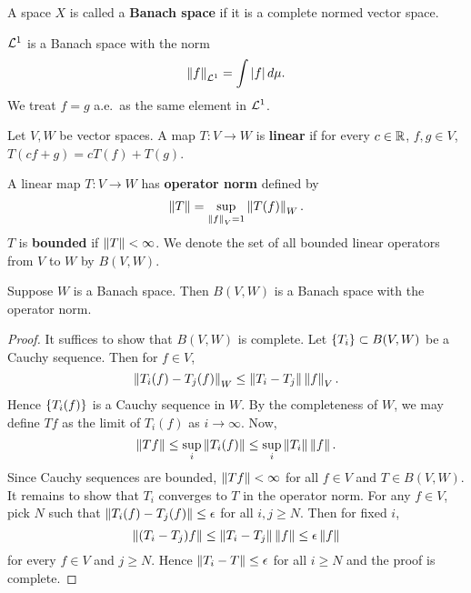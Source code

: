 \begin{definition}
    A space $X$ is called a \textbf{Banach space} if it is a 
    complete normed vector space.
\end{definition}
\begin{remark}
    $\mathcal{L}^1$ is a Banach space with the norm 
    \begin{equation*}
        \left\lVert {f} \right\rVert_{\mathcal{L}^1} = \int \left\lvert {f} \right\rvert d\mu.
    \end{equation*}
    We treat $f = g$ a.e.\ as the same element in $\mathcal{L}^1$.
\end{remark}

\begin{definition}
    Let $V,W$ be vector spaces. A map $T:V\to W$ is \textbf{linear} 
    if for every $c\in\mathbb{R}$, $f,g\in V$, $T(cf+g) = cT(f)+T(g)$.
\end{definition} 

\begin{definition}
    A linear map $T:V\to W$ has \textbf{operator norm} defined 
    by 
    \begin{equation*}
        \left\lVert {T} \right\rVert = \sup_{\left\lVert {f} \right\rVert_V=1}\left\lVert {T(f)} \right\rVert_W.
    \end{equation*} 
    $T$ is \textbf{bounded} if $\left\lVert {T} \right\rVert<\infty$. We denote the 
    set of all bounded linear operators from $V$ to $W$ by 
    $B(V,W)$. 
\end{definition}

\begin{proposition}
    Suppose $W$ is a Banach space. Then $B(V,W)$ is a Banach 
    space with the operator norm.
\end{proposition}
\begin{proof}
    It suffices to show that $B(V,W)$ is complete. Let 
    $\left\{ {T_i} \right\}\subset B(V,W)$ be a Cauchy sequence. Then for 
    $f\in V$, 
    \begin{equation*}
        \left\lVert {T_i(f)-T_j(f)} \right\rVert_W \leq \left\lVert {T_i-T_j} \right\rVert\left\lVert {f} \right\rVert_V.
    \end{equation*} 
    Hence $\left\{ {T_i(f)} \right\}$ is a Cauchy sequence in $W$. By the 
    completeness of $W$, we may define $Tf$ as the limit of 
    $T_i(f)$ as $i\to\infty$. Now, 
    \begin{equation*}
        \left\lVert {Tf} \right\rVert \leq \sup_i\left\lVert {T_i(f)} \right\rVert \leq \sup_i \left\lVert {T_i} \right\rVert\left\lVert {f} \right\rVert.
    \end{equation*}
    Since Cauchy sequences are bounded, $\left\lVert {Tf} \right\rVert < \infty$ for 
    all $f\in V$ and $T\in B(V,W)$. It remains to show that 
    $T_i$ converges to $T$ in the operator norm. For any $f\in V$, 
    pick $N$ such that $\left\lVert {T_i(f)-T_j(f)} \right\rVert\leq\epsilon$ for all 
    $i,j\geq N$. Then for fixed $i$, 
    \begin{equation*}
        \left\lVert {(T_i-T_j)f} \right\rVert \leq \left\lVert {T_i-T_j} \right\rVert\left\lVert {f} \right\rVert \leq \epsilon\left\lVert {f} \right\rVert 
    \end{equation*}
    for every $f\in V$ and $j\geq N$. Hence $\left\lVert {T_i - T} \right\rVert\leq\epsilon$ 
    for all $i\geq N$ and the proof is complete.
\end{proof} 

